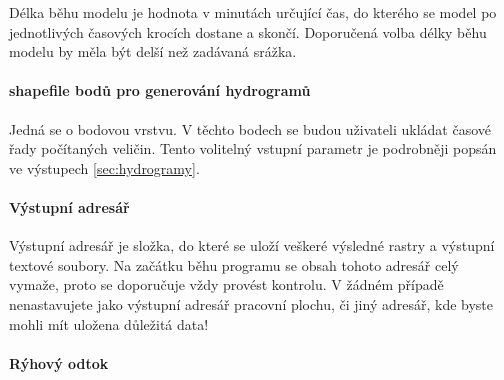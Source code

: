 Délka běhu modelu je hodnota v minutách určující čas, do kterého se model po jednotlivých časových krocích dostane a skončí. Doporučená volba délky běhu modelu by měla být delší než zadávaná srážka.
 




\paragraph{shapefile bodů pro generování hydrogramů} \label{sec:vstupbody}

Jedná  se o bodovou vrstvu. V těchto bodech se budou uživateli ukládat časové řady počítaných veličin. Tento volitelný vstupní parametr je podrobněji popsán ve výstupech \ref{sec:hydrogramy}.

\paragraph{Výstupní adresář} \label{sec:vstupadresar}
Výstupní adresář je složka, do které se uloží veškeré výsledné rastry a výstupní textové soubory. Na začátku běhu programu se obsah tohoto adresář celý vymaže, proto se doporučuje vždy provést kontrolu. V žádném případě nenastavujete jako výstupní adresář pracovní plochu, či jiný adresář, kde byste mohli mít uložena důležitá data!

\paragraph{Rýhový odtok} \label{sec:vstupryhovy}

